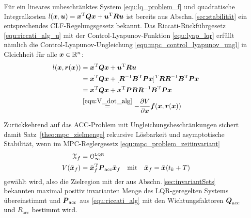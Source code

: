 Für ein lineares unbeschränktes System \eqref{equ:lq_problem_f} und quadratische Integralkosten $l(\boldsymbol{x}, \boldsymbol{u}) = \boldsymbol{x}^{{\rm T}} \boldsymbol{Q} \boldsymbol{x} + \boldsymbol{u}^{{\rm T}} \boldsymbol{R} \boldsymbol{u}$ ist bereits aus Abschn.\,\ref{sec:stabilität} ein entsprechendes CLF-Regelungsgesetz bekannt. Das
 Riccati-Rückführgesetz \eqref{equ:riccati_alg_u} mit der  Control-Lyapunov-Funktion \eqref{equ:lyap_lqr} erfüllt nämlich die Control-Lyapunov-Ungleichung \eqref{equ:mpc_control_lyapunov_ungl} in Gleichheit für alle $\boldsymbol{x}\in \mathbb R^n$:
%
\begin{align*}
\nonumber
l(\boldsymbol{x}, \boldsymbol{r}(\boldsymbol{x}))
	&= \boldsymbol{x}^{{\rm T}} \boldsymbol{Q} \boldsymbol{x} + \boldsymbol{u}^{{\rm T}} \boldsymbol{R} \boldsymbol{u} \\
	&= \boldsymbol{x}^{{\rm T}} \boldsymbol{Q} \boldsymbol{x} + [\boldsymbol{R}^{-1} \boldsymbol{B}^{{\rm T}} \boldsymbol{P} \boldsymbol{x}]^{{\rm T}} \boldsymbol{R} \boldsymbol{R}^{-1} \boldsymbol{B}^{{\rm T}} \boldsymbol{P} \boldsymbol{x}\\
	&= \boldsymbol{x}^{{\rm T}} \boldsymbol{Q} \boldsymbol{x} + \boldsymbol{x}^{{\rm T}} \boldsymbol{P} \boldsymbol{B} \boldsymbol{R}^{-1} \boldsymbol{B}^{{\rm T}} \boldsymbol{P} \boldsymbol{x} \\
	&\stackrel{\eqref{equ:V_dot_alg}}{=} - \frac{\partial V}{\partial \boldsymbol{x}} \boldsymbol{f}(\boldsymbol{x}, \boldsymbol{r}(\boldsymbol{x}))
\end{align*}


Zurückkehrend auf das ACC-Problem mit Ungleichungsbeschränkungen sichert damit Satz~\ref{theo:mpc_zielmenge} rekursive Lösbarkeit und asymptotische Stabilität, wenn im MPC-Reglergesetz \eqref{equ:mpc_problem_zeitinvariant}
\begin{align*}
	\mathcal X_f &= \mathcal O_\infty^{\text{\tiny LQR}} \\
	V(\bar{\bs x}_f) &= \bar{\bs x}_f^\T \bs P_\text{acc} \bar{\bs x}_f \quad \text{mit}\quad \bar{\bs x}_f = \bar{\bs x}(t_k + T) 
\end{align*}
gewählt wird, also die Zielregion mit der aus Abschn.\,\ref{sec:invariantSets} bekannten maximal positiv invarianten Menge des LQR-geregelten Systems übereinstimmt und
$\boldsymbol{P}_\text{acc}$ aus \eqref{equ:riccati_alg} mit den Wichtungsfaktoren $\boldsymbol{Q}_\text{acc}$ und $R_\text{acc}$ bestimmt wird.

